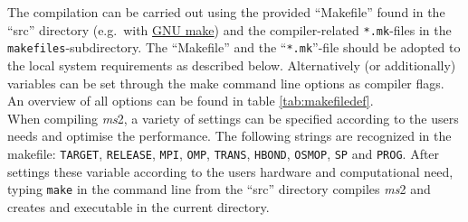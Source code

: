 

The compilation can be carried out using the provided ``Makefile'' found in the ``src'' directory (e.g.\ with \href{http://www.gnu.org/software/make/}{GNU make}) and the compiler-related \texttt{*.mk}-files in the \texttt{makefiles}-subdirectory. The ``Makefile'' and the ``\texttt{*.mk}''-file should be adopted to the local system requirements as described below. Alternatively (or additionally) variables can be set through the make command line options as compiler flags. An overview of all options can be found in table \ref{tab:makefiledef}.\\
When compiling \textit{ms}2, a variety of settings can be specified according to the users needs and optimise the performance. The following strings are recognized in the makefile: \texttt{TARGET}, \texttt{RELEASE}, \texttt{MPI}, \texttt{OMP}, \texttt{TRANS}, \texttt{HBOND}, \texttt{OSMOP}, \texttt{SP} and \texttt{PROG}. After settings these variable according to the users hardware and computational need, typing \texttt{make} in the command line from the ``src'' directory compiles \textit{ms}2 and creates and executable in the current directory.


